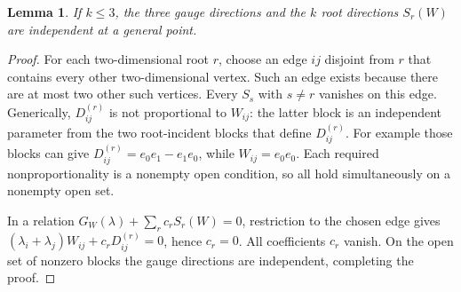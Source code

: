 \documentclass[11pt]{article}
\newtheorem{lemma}[theorem]{Lemma}
\theoremstyle{remark}\newtheorem{remark}[theorem]{Remark}
\begin{document}
\begin{lemma}\label{lem:four-independence}
If $k\leq3$, the three gauge directions and the $k$ root directions
$S_r(W)$ are independent at a general point.
\end{lemma}
\begin{proof}
For each two-dimensional root $r$, choose an edge $ij$ disjoint from
$r$ that contains every other two-dimensional vertex. Such an edge
exists because there are at most two other such vertices. Every
$S_s$ with $s\ne r$ vanishes on this edge. Generically,
$D_{ij}^{(r)}$ is not proportional to $W_{ij}$: the latter block is an
independent parameter from the two root-incident blocks that define
$D_{ij}^{(r)}$. For example those blocks can give
$D_{ij}^{(r)}=e_0e_1-e_1e_0$, while $W_{ij}=e_0e_0$.
Each required nonproportionality is a nonempty open condition, so all
hold simultaneously on a nonempty open set.

In a relation $G_W(\lambda)+\sum_r c_rS_r(W)=0$, restriction to the
chosen edge gives
$(\lambda_i+\lambda_j)W_{ij}+c_rD_{ij}^{(r)}=0$, hence $c_r=0$.
All coefficients $c_r$ vanish. On the open set of nonzero blocks the
gauge directions are independent, completing the proof.
\end{proof}
\end{document}
